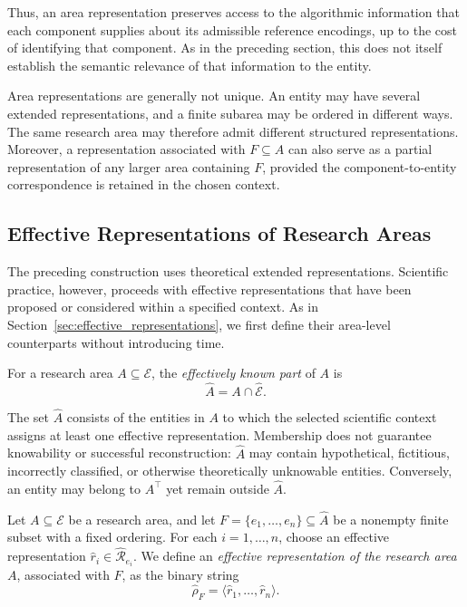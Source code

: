 Thus, an area representation preserves access to the algorithmic information that each component supplies about its admissible reference encodings, up to the cost of identifying that component. As in the preceding section, this does not itself establish the semantic relevance of that information to the entity.

Area representations are generally not unique. An entity may have several extended representations, and a finite subarea may be ordered in different ways. The same research area may therefore admit different structured representations. Moreover, a representation associated with $F\subseteq A$ can also serve as a partial representation of any larger area containing $F$, provided the component-to-entity correspondence is retained in the chosen context.

\subsection*{Effective Representations of Research Areas}

The preceding construction uses theoretical extended representations. Scientific practice, however, proceeds with effective representations that have been proposed or considered within a specified context. As in Section~\ref{sec:effective_representations}, we first define their area-level counterparts without introducing time.

\begin{definition}
For a research area $A\subseteq\mathcal E$, the \emph{effectively known part} of $A$ is
\[
\hat A=A\cap\hat{\mathcal E}.
\]
\end{definition}

The set $\hat A$ consists of the entities in $A$ to which the selected scientific context assigns at least one effective representation. Membership does not guarantee knowability or successful reconstruction: $\hat A$ may contain hypothetical, fictitious, incorrectly classified, or otherwise theoretically unknowable entities. Conversely, an entity may belong to $A^\top$ yet remain outside $\hat A$.

\begin{definition}
Let $A\subseteq\mathcal E$ be a research area, and let $F=\{e_1,\ldots,e_n\}\subseteq\hat A$ be a nonempty finite subset with a fixed ordering. For each $i=1,\ldots,n$, choose an effective representation $\hat r_i\in\hat{\mathcal R}_{e_i}$. We define an \emph{effective representation of the research area} $A$, associated with $F$, as the binary string
\[
\hat\rho_F=\langle\hat r_1,\ldots,\hat r_n\rangle.
\]
\end{definition}

